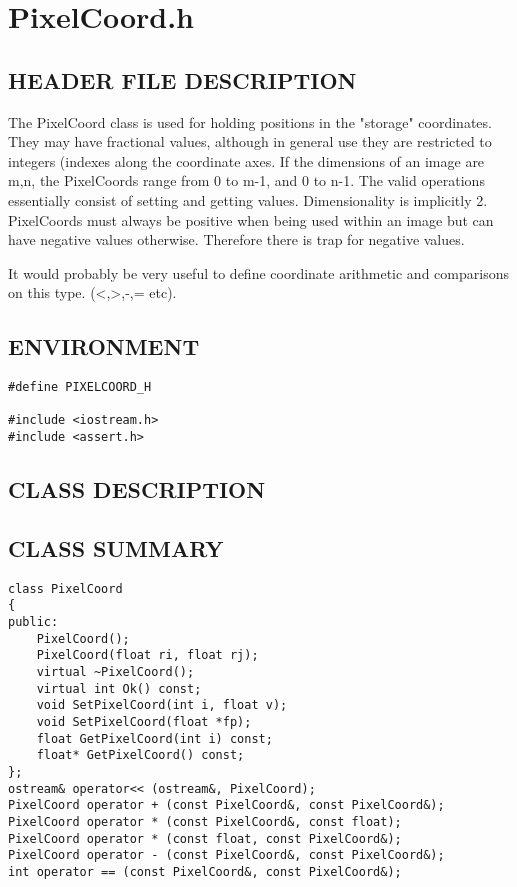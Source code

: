 \clearpage
\section{PixelCoord.h}

\subsection*{HEADER FILE DESCRIPTION}
   The PixelCoord class is used for holding positions in the "storage" 
   coordinates. They may have fractional values, although in general use
   they are restricted to integers (indexes along the coordinate
   axes. If the dimensions of an image are m,n, the PixelCoords range 
   from 0 to m-1, and 0 to n-1.  The valid operations
   essentially consist of setting and getting values. Dimensionality
   is implicitly 2. PixelCoords must always be positive when being used
   within an image but can have negative values otherwise. Therefore there is
   trap for negative values.
  
   It would probably be very useful to define coordinate arithmetic and
   comparisons on this type. (<,>,-,= etc).
  
\subsection*{ENVIRONMENT}
\begin{verbatim}
#define PIXELCOORD_H

#include <iostream.h>
#include <assert.h>

\end{verbatim}

\subsection*{CLASS DESCRIPTION}

\subsection*{CLASS SUMMARY}
\begin{verbatim}
class PixelCoord
{
public:
    PixelCoord();
    PixelCoord(float ri, float rj);
    virtual ~PixelCoord();
    virtual int Ok() const;
    void SetPixelCoord(int i, float v);
    void SetPixelCoord(float *fp);
    float GetPixelCoord(int i) const;
    float* GetPixelCoord() const;
};
ostream& operator<< (ostream&, PixelCoord);
PixelCoord operator + (const PixelCoord&, const PixelCoord&);
PixelCoord operator * (const PixelCoord&, const float);
PixelCoord operator * (const float, const PixelCoord&);
PixelCoord operator - (const PixelCoord&, const PixelCoord&);
int operator == (const PixelCoord&, const PixelCoord&);
\end{verbatim}

